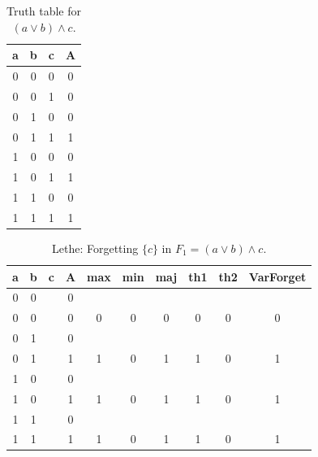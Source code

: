 \begin{table}[!tb]
    \centering
    \begin{tabular}{|c|c|c|c|}
        \hline
        \textbf{a} & \textbf{b} & \textbf{c} & \textbf{A} \\ \hline
        0 & 0 & 0 & 0 \\ \hline
        0 & 0 & 1 & 0 \\ \hline
        0 & 1 & 0 & 0 \\ \hline
        0 & 1 & 1 & 1 \\ \hline
        1 & 0 & 0 & 0 \\ \hline
        1 & 0 & 1 & 1 \\ \hline
        1 & 1 & 0 & 0 \\ \hline
        1 & 1 & 1 & 1 \\ \hline
    \end{tabular}
    \caption{Truth table for $(a \lor b) \land c$.}
    \label{tab:truthtab}
\end{table}

\begin{table}[!tb]
    \centering
    \begin{tabular}{|c|c|c|c|c|c|c|c|c|c|}
        \hline
        \textbf{a} & \textbf{b} & \textbf{c} & \textbf{A} & \textbf{max} & \textbf{min} & \textbf{maj} & \textbf{th1} & \textbf{th2} & \textbf{VarForget} \\ \hline
        \rowcolor{gray!40} 0 & 0 &  & 0 &  &  &  &  &  &  \\ \hline
        \rowcolor{gray!40} 0 & 0 &  & 0 & 0 & 0 & 0 & 0 & 0 & 0 \\ \hline
        \rowcolor{blue!40} 0 & 1 &  & 0 &  &  &  &  &  &  \\ \hline
        \rowcolor{blue!40} 0 & 1 &  & 1 & 1 & 0 & 1 & 1 & 0 & 1 \\ \hline
        \rowcolor{red!40} 1 & 0 &  & 0 &  &  &  &  &  &  \\ \hline
        \rowcolor{red!40} 1 & 0 &  & 1 & 1 & 0 & 1 & 1 & 0 & 1 \\ \hline
        \rowcolor{green!40} 1 & 1 &  & 0 &  &  &  &  &  &  \\ \hline
        \rowcolor{green!40} 1 & 1 &  & 1 & 1 & 0 & 1 & 1 & 0 & 1 \\ \hline
    \end{tabular}
    \caption{Lethe: Forgetting $\{c\}$ in $F_{1} = (a \lor b) \land c$.}
    \label{tab:lethe-F1-c}
\end{table}
